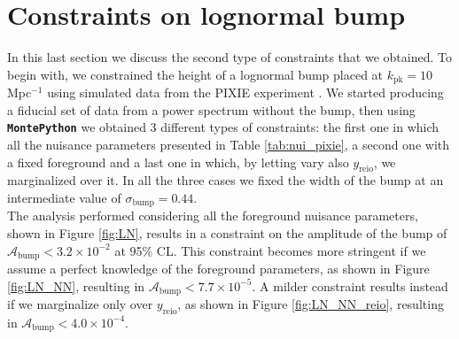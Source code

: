 \section{Constraints on lognormal bump}
In this last section we discuss the second type of constraints that we obtained. To begin with, we constrained the height of a lognormal bump placed at $k_\text{pk}=10$ Mpc$^{-1}$ using simulated data from the PIXIE experiment \cite{pixie}. We started producing a fiducial set of data from a power spectrum without the bump, then using \textbf{\texttt{MontePython}} we obtained 3 different types of constraints: the first one in which all the nuisance parameters presented in Table \ref{tab:nui_pixie}, a second one with a fixed foreground and a last one in which, by letting vary also $y_\text{reio}$, we marginalized over it.  In all the three cases we fixed the width of the bump at an intermediate value of $\sigma_\text{bump}=0.44$.\\
The analysis performed considering all the foreground nuisance parameters, shown in Figure \ref{fig:LN}, results in a constraint on the amplitude of the bump of $\mathcal{A}_\text{bump}<3.2\times10^{-2}$ at 95\% CL. This constraint becomes more stringent if we assume a perfect knowledge of the foreground parameters, as shown in Figure \ref{fig:LN_NN}, resulting in $\mathcal{A}_\text{bump}<7.7\times10^{-5}$. A milder constraint results instead if we marginalize only over $y_\text{reio}$, as shown in Figure \ref{fig:LN_NN_reio}, resulting in $\mathcal{A}_\text{bump}<4.0\times10^{-4}$.\\ 

